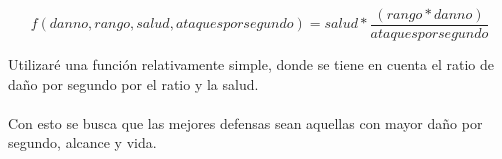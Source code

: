 $$ f(danno,rango,salud,ataques por segundo) = salud * \frac{(rango*danno)}{ataques por segundo} $$

Utilizaré una función relativamente simple, donde se tiene en cuenta el ratio de daño por segundo por el ratio y la salud.
\\
\\
Con esto se busca que las mejores defensas sean aquellas con mayor daño por segundo, alcance y vida.
